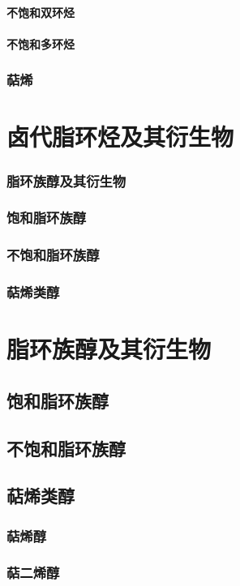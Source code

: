 \documentclass[UTF8]{../03-Chemistry}
\begin{document}
        \paragraph{不饱和双环烃}
        \paragraph{不饱和多环烃}
    \subsubsection{萜烯}
\section{卤代脂环烃及其衍生物}
    \subsubsection{脂环族醇及其衍生物}
    \subsubsection{饱和脂环族醇}
    \subsubsection{不饱和脂环族醇}
    \subsubsection{萜烯类醇}
\section{脂环族醇及其衍生物}
    \subsection{饱和脂环族醇}
    \subsection{不饱和脂环族醇}
    \subsection{萜烯类醇}
        \subsubsection{萜烯醇}
        \subsubsection{萜二烯醇}
\end{document}
